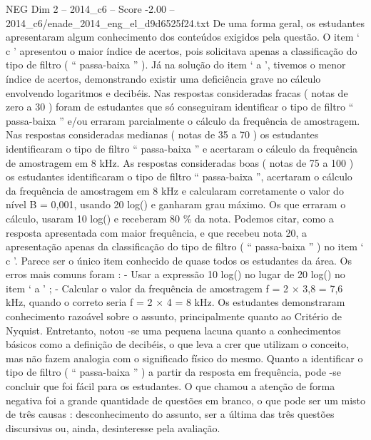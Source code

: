 \begin{textsample}{NEG Dim 2 – 2014\_c6 – Score -2.00 – 2014\_c6/enade\_2014\_eng\_el\_d9d6525f24.txt}
De uma forma geral, os estudantes apresentaram algum conhecimento dos conteúdos exigidos pela questão.
O item ‘ c ’ apresentou o maior índice de acertos, pois solicitava apenas a classificação do tipo de filtro ( “ passa-baixa ” ).
Já na solução do item ‘ a ’, tivemos o menor índice de acertos, demonstrando existir uma deficiência grave no cálculo envolvendo logaritmos e decibéis.
Nas respostas consideradas fracas ( notas de zero a 30 ) foram de estudantes que só conseguiram identificar o tipo de filtro “ passa-baixa ” e/ou erraram parcialmente o cálculo da frequência de amostragem.
Nas respostas consideradas medianas ( notas de 35 a 70 ) os estudantes identificaram o tipo de filtro “ passa-baixa ” e acertaram o cálculo da frequência de amostragem em 8 kHz.
As respostas consideradas boas ( notas de 75 a 100 ) os estudantes identificaram o tipo de filtro “ passa-baixa ”, acertaram o cálculo da frequência de amostragem em 8 kHz e calcularam corretamente o valor do nível B = 0,001, usando 20 log() e ganharam grau máximo.
Os que erraram o cálculo, usaram 10 log() e receberam 80 \% da nota.
Podemos citar, como a resposta apresentada com maior frequência, e que recebeu nota 20, a apresentação apenas da classificação do tipo de filtro ( “ passa-baixa ” ) no item ‘ c ’.
Parece ser o único item conhecido de quase todos os estudantes da área.
Os erros mais comuns foram : - Usar a expressão 10 log() no lugar de 20 log() no item ‘ a ’ ; - Calcular o valor da frequência de amostragem f = 2 × 3,8 = 7,6 kHz, quando o correto seria f = 2 × 4 = 8 kHz.
Os estudantes demonstraram conhecimento razoável sobre o assunto, principalmente quanto ao Critério de Nyquist.
Entretanto, notou -se uma pequena lacuna quanto a conhecimentos básicos como a definição de decibéis, o que leva a crer que utilizam o conceito, mas não fazem analogia com o significado físico do mesmo.
Quanto a identificar o tipo de filtro ( “ passa-baixa ” ) a partir da resposta em frequência, pode -se concluir que foi fácil para os estudantes.
O que chamou a atenção de forma negativa foi a grande quantidade de questões em branco, o que pode ser um misto de três causas : desconhecimento do assunto, ser a última das três questões discursivas ou, ainda, desinteresse pela avaliação.

\end{textsample}
